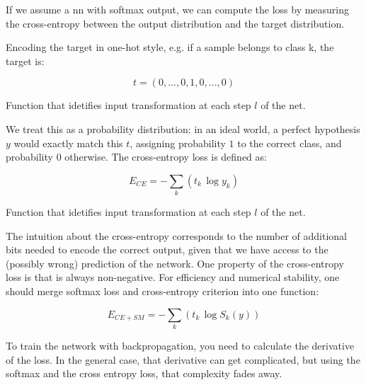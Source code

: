 \noindent If we assume a \gls{nn} with softmax output, we can compute the loss by measuring the cross-entropy between the output distribution and the target distribution.

\noindent Encoding the target in one-hot style, e.g. if a sample belongs to class k, the target is:

\begin{Equation}[H]
	\centering
	\begin{equation}
		t=(0,...,0,1,0,...,0)
	\end{equation}
	\caption[Forward propagation.]{Function that idetifies input transformation at each step $l$ of the net.}
	\label{eq:activationfun}
\end{Equation}

\noindent We treat this as a probability distribution: in an ideal world, a perfect hypothesis $y$ would exactly match this $t$, assigning probability $1$ to the correct class, and probability $0$ otherwise. The cross-entropy loss is defined as:

\begin{Equation}[H]
	\centering
	\begin{equation}
		E_{CE} = -\sum_{k}(t_k \, \log y_k)
	\end{equation}
	\caption[Forward propagation.]{Function that idetifies input transformation at each step $l$ of the net.}
	\label{eq:activationfun}
\end{Equation}

\noindent The intuition about the cross-entropy corresponds to the number of additional bits needed to encode the
correct output, given that we have access to the (possibly wrong) prediction of the network. One property of the cross-entropy loss is that is always non-negative. For efficiency and numerical stability, one should merge
softmax loss and cross-entropy criterion into one function:

\begin{Equation}[H]
	\centering
	\begin{equation}
		E_{CE+SM} = -\sum_{k}(t_k \, \log S_k(y))
	\end{equation}
	\caption[Softmax cross entropy.]{To train the network with backpropagation, you need to calculate the derivative of the loss. In the general case, that derivative can get complicated, but using the softmax and the cross entropy loss, that complexity fades away.}
	\label{eq:softmaxcrossentr}
\end{Equation}

